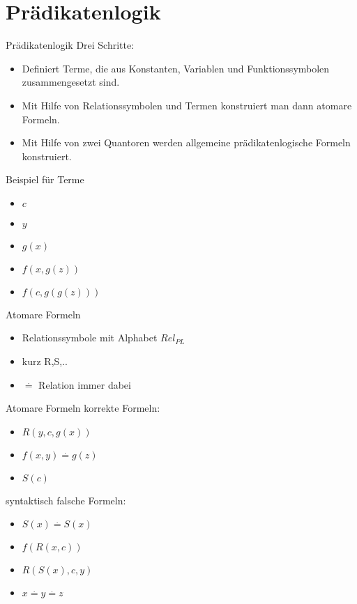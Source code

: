 \section{Prädikatenlogik}

\begin{frame}{Prädikatenlogik}
  Drei Schritte:
  \begin{itemize}
    \item Definiert Terme, die aus Konstanten, Variablen und Funktionssymbolen zusammengesetzt sind.
    \item Mit Hilfe von Relationssymbolen und Termen konstruiert man dann atomare Formeln.
    \item Mit Hilfe von zwei Quantoren werden allgemeine prädikatenlogische Formeln konstruiert.
  \end{itemize}
\end{frame}

\begin{frame}{Beispiel für Terme}
  \begin{itemize}
    \item $c$
    \item $y$
    \item $g(x)$
    \item $f(x,g(z))$
    \item $f(c,g(g(z)))$
  \end{itemize}
\end{frame}

\begin{frame}{Atomare Formeln}
  \begin{itemize}
    \item Relationssymbole mit Alphabet $Rel_{PL}$
    \item kurz R,S,..
    \item $\stackrel{.}{=}$ Relation immer dabei
  \end{itemize}
\end{frame}

\begin{frame}{Atomare Formeln}
  korrekte Formeln:
  \begin{itemize}
    \item $R(y,c,g(x))$
    \item $f(x,y)\stackrel{.}{=}g(z)$
    \item $S(c)$
  \end{itemize}
  syntaktisch falsche Formeln:
  \begin{itemize}
    \item $S(x)\stackrel{.}{=}S(x)$
    \item $f(R(x,c))$
    \item $R(S(x),c,y)$
    \item $x\stackrel{.}{=}y\stackrel{.}{=}z$
  \end{itemize}
\end{frame}

